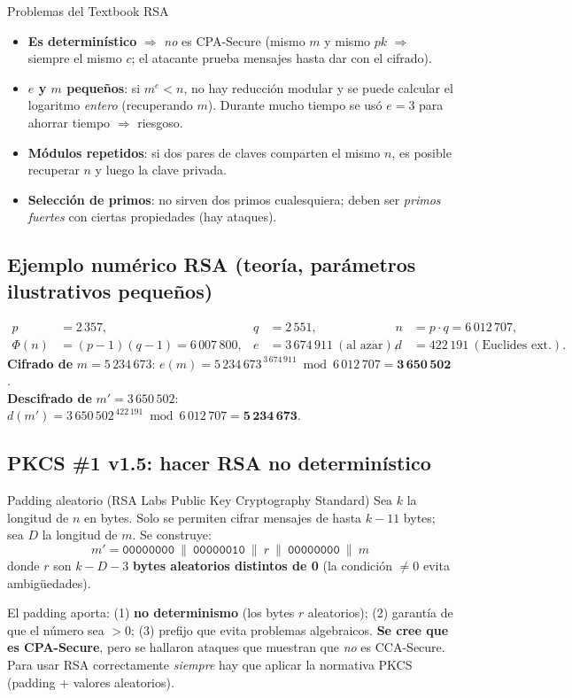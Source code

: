 \documentclass[11pt,a4paper]{article}
\begin{document}
\begin{warnbox}{Problemas del Textbook RSA}
\begin{itemize}[leftmargin=1.4em,itemsep=1pt]
  \item \textbf{Es determinístico} $\Rightarrow$ \emph{no} es CPA-Secure (mismo $m$ y mismo $pk$
        $\Rightarrow$ siempre el mismo $c$; el atacante prueba mensajes hasta dar con el
        cifrado).
  \item \textbf{$e$ y $m$ pequeños}: si $m^e < n$, no hay reducción modular y se puede calcular
        el logaritmo \emph{entero} (recuperando $m$). Durante mucho tiempo se usó $e=3$ para
        ahorrar tiempo $\Rightarrow$ riesgoso.
  \item \textbf{Módulos repetidos}: si dos pares de claves comparten el mismo $n$, es posible
        recuperar $n$ y luego la clave privada.
  \item \textbf{Selección de primos}: no sirven dos primos cualesquiera; deben ser
        \emph{primos fuertes} con ciertas propiedades (hay ataques).
\end{itemize}
\end{warnbox}

\subsection{Ejemplo numérico RSA (teoría, parámetros ilustrativos pequeños)}
\begin{slidebox}
\[
\begin{aligned}
  p&=2\,357, & q&=2\,551, & n&=p\cdot q = 6\,012\,707,\\
  \Phi(n)&=(p-1)(q-1)=6\,007\,800, & e&=3\,674\,911\ (\text{al azar}), &
  d&=422\,191\ (\text{Euclides ext.}).
\end{aligned}
\]
\textbf{Cifrado de} $m=5\,234\,673$:\quad
$e(m)=5\,234\,673^{\,3\,674\,911}\bmod 6\,012\,707 = \mathbf{3\,650\,502}$.\\[2pt]
\textbf{Descifrado de} $m'=3\,650\,502$:\quad
$d(m')=3\,650\,502^{\,422\,191}\bmod 6\,012\,707 = \mathbf{5\,234\,673}$. \quad\checkmark
\end{slidebox}

\subsection{PKCS \#1 v1.5: hacer RSA no determinístico}
\begin{defbox}{Padding aleatorio (RSA Labs Public Key Cryptography Standard)}
Sea $k$ la longitud de $n$ en bytes. Solo se permiten cifrar mensajes de hasta $k-11$ bytes;
sea $D$ la longitud de $m$. Se construye:
\[
  m' = \texttt{00000000}\ \|\ \texttt{00000010}\ \|\ r\ \|\ \texttt{00000000}\ \|\ m
\]
donde $r$ son $k-D-3$ \textbf{bytes aleatorios distintos de 0} (la condición $\neq 0$ evita
ambigüedades).
\end{defbox}
El padding aporta: (1) \textbf{no determinismo} (los bytes $r$ aleatorios); (2) garantía de que
el número sea $>0$; (3) prefijo que evita problemas algebraicos. \textbf{Se cree que es
CPA-Secure}, pero se hallaron ataques que muestran que \emph{no} es CCA-Secure. Para usar RSA
correctamente \emph{siempre} hay que aplicar la normativa PKCS (padding + valores aleatorios).
\end{document}
